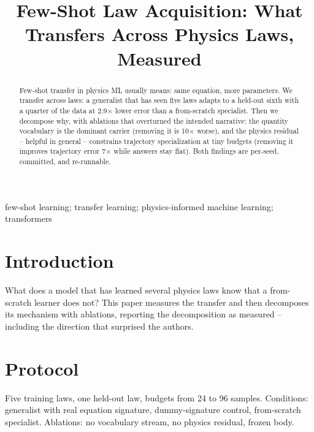 \documentclass[conference,10pt]{IEEEtran}
\begin{document}
\title{Few-Shot Law Acquisition: What Transfers Across Physics Laws, Measured}

\author{
}

\maketitle

\begin{abstract}
Few-shot transfer in physics ML usually means: same equation, more parameters. We transfer across laws: a generalist that has seen five laws adapts to a held-out sixth with a quarter of the data at 2.9$\times$ lower error than a from-scratch specialist. Then we decompose why, with ablations that overturned the intended narrative: the quantity vocabulary is the dominant carrier (removing it is 10$\times$ worse), and the physics residual -- helpful in general -- constrains trajectory specialization at tiny budgets (removing it improves trajectory error 7$\times$ while answers stay flat). Both findings are per-seed, committed, and re-runnable.
\end{abstract}

\begin{IEEEkeywords}
few-shot learning; transfer learning; physics-informed machine learning; transformers
\end{IEEEkeywords}

\section{Introduction}
What does a model that has learned several physics laws know that a from-scratch learner does not? This paper measures the transfer and then decomposes its mechanism with ablations, reporting the decomposition as measured -- including the direction that surprised the authors.

\section{Protocol}
Five training laws, one held-out law, budgets from 24 to 96 samples. Conditions: generalist with real equation signature, dummy-signature control, from-scratch specialist. Ablations: no vocabulary stream, no physics residual, frozen body.
\end{document}
